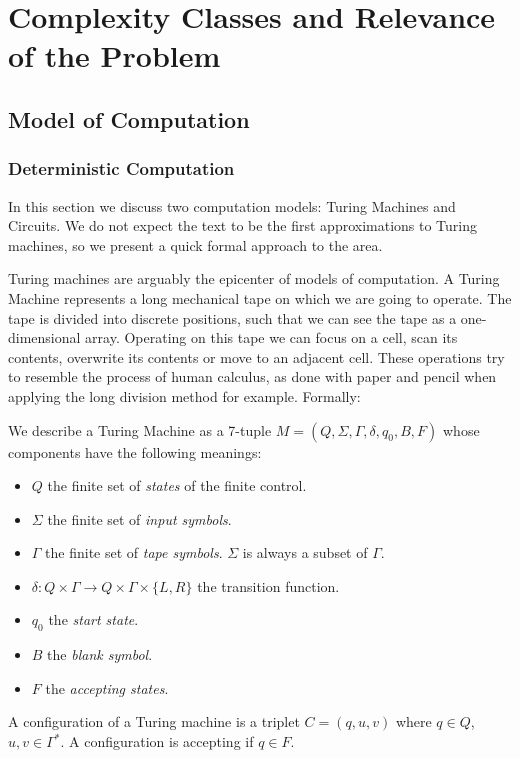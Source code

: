 \chapter{Complexity Classes and Relevance of the Problem}
\section{Model of Computation}

\subsection{Deterministic Computation}
In this section we discuss two computation models: Turing Machines and Circuits. We do not expect the text to be the first approximations to Turing machines, so we present a quick formal approach to the area. 

Turing machines are arguably the epicenter of  models of computation. A Turing Machine  represents a long mechanical tape on which we are going to operate. The tape is divided into discrete positions, such that we can see the tape as a one-dimensional array. Operating on this tape we can focus on a cell, scan its contents, overwrite  its contents or move to an adjacent cell. These operations try to resemble the process of human calculus, as done with paper and pencil when applying the long division method  for example. Formally:

\begin{definition} We describe a Turing Machine as a 7-tuple $M=(Q, \Sigma, \Gamma, \delta, q_0, B, F)$ whose components have the following meanings:
  \begin{itemize}
  \item $Q$ the finite set of \emph{states} of the finite control.
  \item $\Sigma$ the finite set of \emph{input symbols}.
  \item $\Gamma$ the finite set of \emph{tape symbols}. $\Sigma$ is always a subset of $\Gamma$.
  \item  $\delta: Q\times \Gamma \to Q\times\Gamma\times\{L,R\}$ the transition function.
  \item $q_0$ the \emph{start state}.
  \item $B$ the \emph{blank symbol}.
  \item $F$ the \emph{accepting states}.
  \end{itemize}

  A configuration of a Turing machine is a triplet $C=(q,u,v)$ where $q\in Q$, $u,v\in \Gamma^*$. A configuration is accepting if $q\in F$.
\end{definition}

